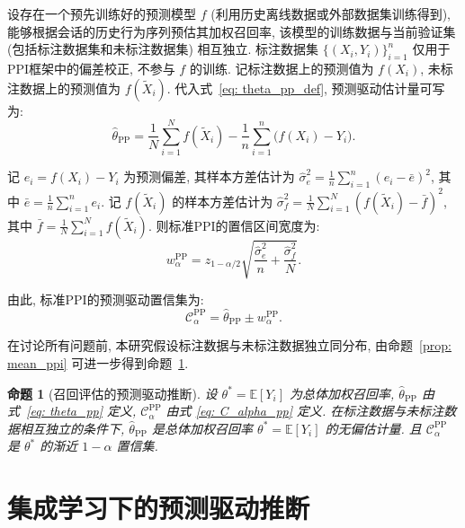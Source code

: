 \documentclass[a4paper, AutoFakeBold, UTF8]{ctexrep}
\theoremstyle{plain}
\newtheorem{prop}{命题}[chapter]
\numberwithin{equation}{chapter}
\begin{document}
设存在一个预先训练好的预测模型 $f$ (利用历史离线数据或外部数据集训练得到), 能够根据会话的历史行为序列预估其加权召回率, 该模型的训练数据与当前验证集 (包括标注数据集和未标注数据集) 相互独立. 标注数据集 $\{ (X_i, Y_i) \}_{i=1}^n$ 仅用于PPI框架中的偏差校正, 不参与 $f$ 的训练. 记标注数据上的预测值为 $f (X_i) $, 未标注数据上的预测值为 $f (\tilde{X}_i) $. 代入式~\eqref{eq: theta_pp_def}, 预测驱动估计量可写为: 
\begin{equation}
\hat{\theta}_{\mathrm{PP}} = \frac{1}{N}\sum_{i=1}^{N} f (\tilde{X}_i)  - \frac{1}{n}\sum_{i=1}^{n} \bigl (f (X_i)  - Y_i\bigr). \label{eq: theta_pp}
\end{equation}

记 $e_i = f (X_i)  - Y_i$ 为预测偏差, 其样本方差估计为 $\hat{\sigma}_{e}^{2} = \frac{1}{n}\sum_{i=1}^{n} (e_i - \bar{e}) ^2$, 其中 $\bar{e} = \frac{1}{n}\sum_{i=1}^{n} e_i$. 记 $f (\tilde{X}_i) $ 的样本方差估计为 $\hat{\sigma}_{f}^{2} = \frac{1}{N}\sum_{i=1}^{N} (f (\tilde{X}_i)  - \bar{f}) ^2$, 其中 $\bar{f} = \frac{1}{N}\sum_{i=1}^{N} f (\tilde{X}_i) $. 则标准PPI的置信区间宽度为: 
\begin{equation}
w_{\alpha}^{\mathrm{PP}} = z_{1-\alpha/2} \sqrt{ \frac{\hat{\sigma}_{e}^{2}}{n} + \frac{\hat{\sigma}_{f}^{2}}{N} }. \label{eq: w_alpha_pp}
\end{equation}

由此, 标准PPI的预测驱动置信集为: 
\begin{equation}
\mathcal{C}_{\alpha}^{\mathrm{PP}} = \hat{\theta}_{\mathrm{PP}} \pm w_{\alpha}^{\mathrm{PP}}. \label{eq: C_alpha_pp}
\end{equation}

在讨论所有问题前, 本研究假设标注数据与未标注数据独立同分布, 由命题~\ref{prop: mean_ppi} 可进一步得到命题~\ref{prop: recall_ppi}. 

\begin{prop}[召回评估的预测驱动推断]
\label{prop: recall_ppi}
设 $\theta^* = \mathbb{E}[Y_i]$ 为总体加权召回率, $\hat{\theta}_{\mathrm{PP}}$ 由式~\eqref{eq: theta_pp} 定义, $\mathcal{C}_{\alpha}^{\mathrm{PP}}$ 由式 \eqref{eq: C_alpha_pp} 定义. 在标注数据与未标注数据相互独立的条件下, $\hat{\theta}_{\mathrm{PP}}$ 是总体加权召回率 $\theta^* = \mathbb{E}[Y_i]$ 的无偏估计量. 且 $\mathcal{C}_{\alpha}^{\mathrm{PP}}$ 是 $\theta^*$ 的渐近 $1-\alpha$ 置信集. 
\end{prop}

\section{集成学习下的预测驱动推断}
\end{document}
